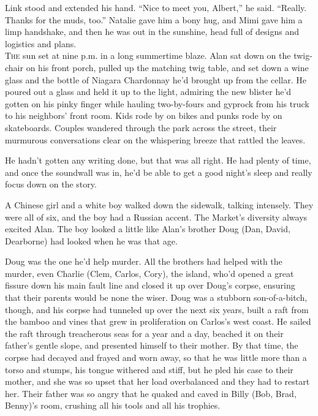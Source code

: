 \documentclass{article}
\begin{document}
Link stood and extended his hand.  ``Nice to meet you, Albert,'' he
said.  ``Really.  Thanks for the muds, too.'' Natalie gave him a bony
hug, and Mimi gave him a limp handshake, and then he was out in the
sunshine, head full of designs and logistics and plans.
\\
\lettrine[lines=3, lhang=.5, nindent=0pt, findent=2pt]{T}{he} sun set at nine p.m.  in a long summertime blaze.  Alan sat down
on the twig-chair on his front porch, pulled up the matching twig
table, and set down a wine glass and the bottle of Niagara Chardonnay
he'd brought up from the cellar.  He poured out a glass and held it up
to the light, admiring the new blister he'd gotten on his pinky finger
while hauling two-by-fours and gyprock from his truck to his
neighbors' front room.  Kids rode by on bikes and punks rode by on
skateboards.  Couples wandered through the park across the street,
their murmurous conversations clear on the whispering breeze that
rattled the leaves.

He hadn't gotten any writing done, but that was all right.  He had
plenty of time, and once the soundwall was in, he'd be able to get a
good night's sleep and really focus down on the story.

A Chinese girl and a white boy walked down the sidewalk, talking
intensely.  They were all of six, and the boy had a Russian accent. 
The Market's diversity always excited Alan.  The boy looked a little
like Alan's brother Doug (Dan, David, Dearborne) had looked when he
was that age.

Doug was the one he'd help murder.  All the brothers had helped with
the murder, even Charlie (Clem, Carlos, Cory), the island, who'd
opened a great fissure down his main fault line and closed it up over
Doug's corpse, ensuring that their parents would be none the wiser. 
Doug was a stubborn son-of-a-bitch, though, and his corpse had
tunneled up over the next six years, built a raft from the bamboo and
vines that grew in proliferation on Carlos's west coast.  He sailed
the raft through treacherous seas for a year and a day, beached it on
their father's gentle slope, and presented himself to their mother. 
By that time, the corpse had decayed and frayed and worn away, so that
he was little more than a torso and stumps, his tongue withered and
stiff, but he pled his case to their mother, and she was so upset that
her load overbalanced and they had to restart her.  Their father was
so angry that he quaked and caved in Billy (Bob, Brad, Benny)'s room,
crushing all his tools and all his trophies.
\end{document}
